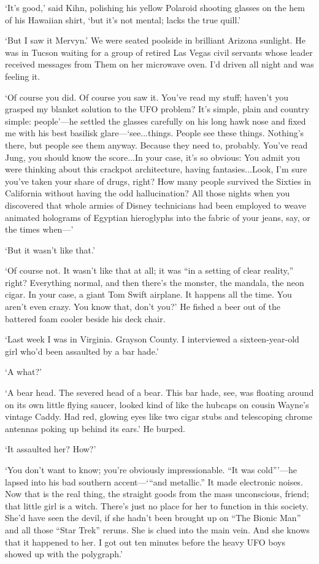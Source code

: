 `It's good,' said Kihn, polishing his yellow Polaroid shooting glasses on the hem of his Hawaiian shirt, `but it's not mental; lacks the true quill.'

`But I saw it Mervyn.' We were seated poolside in brilliant Arizona sunlight. He was in Tucson waiting for a group of retired Las Vegas civil servants whose leader received messages from Them on her microwave oven. I'd driven all night and was feeling it.

`Of course you did. Of course you saw it. You've read my stuff; haven't you grasped my blanket solution to the UFO problem? It's simple, plain and country simple: people'—he settled the glasses carefully on his long hawk nose and fixed me with his best basilisk glare—`see...things. People see these things. Nothing's there, but people see them anyway. Because they need to, probably. You've read Jung, you should know the score...In your case, it's so obvious: You admit you were thinking about this crackpot architecture, having fantasies...Look, I'm sure you've taken your share of drugs, right? How many people survived the Sixties in California without having the odd hallucination? All those nights when you discovered that whole armies of Disney technicians had been employed to weave animated holograms of Egyptian hieroglyphs into the fabric of your jeans, say, or the times when—'

`But it wasn't like that.'

`Of course not. It wasn't like that at all; it was “in a setting of clear reality,” right? Everything normal, and then there's the monster, the mandala, the neon cigar. In your case, a giant Tom Swift airplane. It happens all the time. You aren't even crazy. You know that, don't you?' He fished a beer out of the battered foam cooler beside his deck chair.

`Last week I was in Virginia. Grayson County. I interviewed a sixteen-year-old girl who'd been assaulted by a bar hade.'

`A what?'

`A bear head. The severed head of a bear. This bar hade, see, was floating around on its own little flying saucer, looked kind of like the hubcaps on cousin Wayne's vintage Caddy. Had red, glowing eyes like two cigar stubs and telescoping chrome antennas poking up behind its ears.' He burped.

`It assaulted her? How?'

`You don't want to know; you're obviously impressionable. “It was cold”'—he lapsed into his bad southern accent—`“and metallic.” It made electronic noises. Now that is the real thing, the straight goods from the mass unconscious, friend; that little girl is a witch. There's just no place for her to function in this society. She'd have seen the devil, if she hadn't been brought up on “The Bionic Man” and all those “Star Trek” reruns. She is clued into the main vein. And she knows that it happened to her. I got out ten minutes before the heavy UFO boys showed up with the polygraph.'

